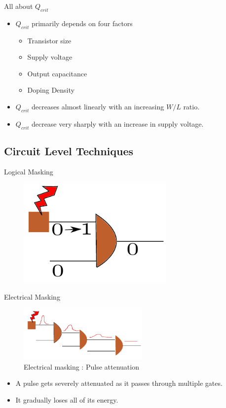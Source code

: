 \documentclass{beamer}
\begin{document}
\begin{frame}[shrink=5]{All about $Q_{crit}$}
 \begin{itemize}
  \item $Q_{crit}$ primarily depends on four factors
      \begin{itemize}	
	\item Transistor size
	\item Supply voltage
	\item Output capacitance
	\item Doping Density
      \end{itemize}
 \end{itemize}
\begin{itemize}
 \item $Q_{crit}$ decreases almost linearly with an increasing $W/L$ ratio. 
  \item $Q_{crit}$ decrease very sharply with an increase in supply voltage. 
\end{itemize}
\end{frame}

\subsection{Circuit Level Techniques}

\begin{frame} {Logical Masking}
\begin{figure}[h]
 \includegraphics[width=3in]{logical_masking}
\end{figure}
\end{frame}

\begin{frame}[shrink=3]{Electrical Masking}
 \begin{figure}[h]
  \includegraphics[width=2.5in]{electrical_masking}
  \caption{\footnotesize Electrical masking : Pulse attenuation}
 \end{figure}


\begin{itemize}
 \item A pulse gets severely attenuated as it passes through multiple gates.
 \item It gradually loses all of its energy. 
\end{itemize}
\end{frame}
\end{document}

